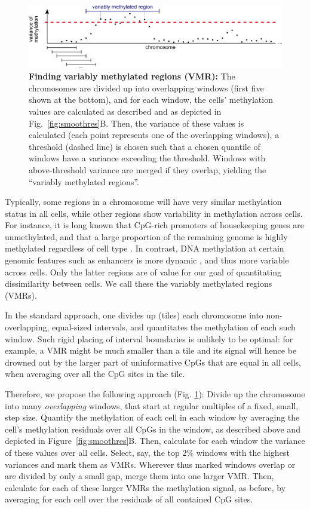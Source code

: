 \documentclass[twocolumn,10pt]{article}
\begin{document}
\begin{figure}
    \includegraphics[width=\columnwidth]{figures/Fig_sliding.png}
    \caption{\small \textbf{Finding variably methylated regions (VMR):} The chromosomes are divided up into overlapping windows (first five shown at the bottom), and for each window, the cells' methylation values are calculated as described and as depicted in Fig.\ \ref{fig:smoothres}B. Then, the variance of these values is calculated (each point represents one of the overlapping windows), a threshold (dashed line) is chosen such that a chosen quantile of windows have a variance exceeding the threshold. Windows with above-threshold variance are merged if they overlap, yielding the ``variably methylated regions''.}
    \label{vmr}
\end{figure}


Typically, some regions in a chromosome will have very similar methylation status in all cells, while other regions show variability in methylation across cells. For instance, it is long known that CpG-rich promoters of housekeeping genes are unmethylated, and that a large proportion of the remaining genome is highly methylated regardless of cell type \citep{bird1986cpg}. In contrast, DNA methylation at certain genomic features such as enhancers is more dynamic \citep{argelaguet2019gastru}, and thus more variable across cells.
Only the latter regions are of value for our goal of quantitating dissimilarity between cells. We call these the variably methylated regions (VMRs).

In the standard approach, one divides up (tiles) each chromosome into non-overlapping, equal-sized intervals, and quantitates the methylation of each such window. Such rigid placing of interval boundaries is unlikely to be optimal: for example, a VMR might be much smaller than a tile and its signal will hence be drowned out by the larger part of uninformative CpGs that are equal in all cells, when averaging over all the CpG sites in the tile.

Therefore, we propose the following approach (Fig. \ref{vmr}): Divide up the chromosome into many \emph{overlapping} windows, that start at regular multiples of a fixed, small, step size. Quantify the methylation of each cell in each window by averaging the cell's methylation residuals over all CpGs in the window, as described above and depicted in Figure\ \ref{fig:smoothres}B. Then, calculate for each window the variance of these values over all cells. Select, say, the top 2\% windows with the highest variances and mark them as VMRs. Wherever thus marked windows overlap or are divided by only a small gap, merge them into one larger VMR. Then, calculate for each of these larger VMRs the methylation signal, as before, by averaging for each cell over the residuals of all contained CpG sites.
\end{document}
